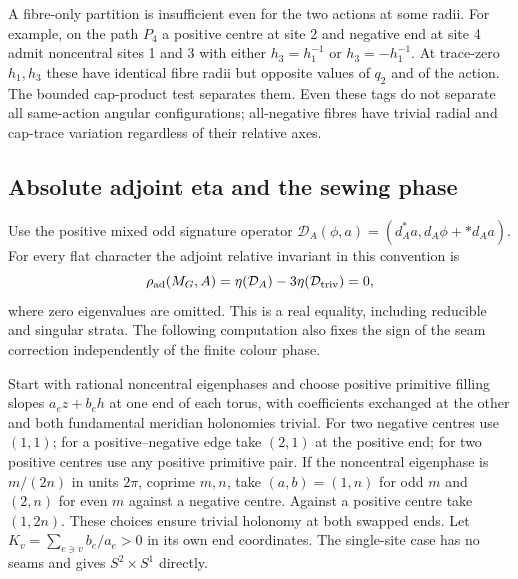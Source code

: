A fibre-only partition is insufficient even for the two actions at some radii. For example, on the path \(P_4\) a positive centre at site 2 and negative end at site 4 admit noncentral sites 1 and 3 with either \(h_3=h_1^{-1}\) or \(h_3=-h_1^{-1}\). At trace-zero \(h_1,h_3\) these have identical fibre radii but opposite values of \(q_2\) and of the action. The bounded cap-product test separates them. Even these tags do not separate all same-action angular configurations; all-negative fibres have trivial radial and cap-trace variation regardless of their relative axes.

\subsection{Absolute adjoint eta and the sewing phase}
\label{phase:eta}

Use the positive mixed odd signature operator
\(\mathcal D_A(\phi,a)=(d_A^*a,d_A\phi+*d_Aa)\).
For every flat character the adjoint relative invariant in this convention is
\begin{equation}
 \rho_{\rm ad}(M_G,A)=
       \eta(\mathcal D_A)-3\eta(\mathcal D_{\rm triv})=0 ,
 \label{phase:rho}
\end{equation}
where zero eigenvalues are omitted. This is a real equality, including reducible and singular strata. The following computation also fixes the sign of the seam correction independently of the finite colour phase.

Start with rational noncentral eigenphases and choose positive primitive filling slopes \(a_e z+b_e h\) at one end of each torus, with coefficients exchanged at the other and both fundamental meridian holonomies trivial. For two negative centres use \((1,1)\); for a positive--negative edge take \((2,1)\) at the positive end; for two positive centres use any positive primitive pair. If the noncentral eigenphase is \(m/(2n)\) in units \(2\pi\), coprime \(m,n\), take \((a,b)=(1,n)\) for odd \(m\) and \((2,n)\) for even \(m\) against a negative centre. Against a positive centre take \((1,2n)\). These choices ensure trivial holonomy at both swapped ends. Let \(K_v=\sum_{e\ni v} b_e/a_e>0\) in its own end coordinates. The single-site case has no seams and gives \(S^2\times S^1\) directly.

